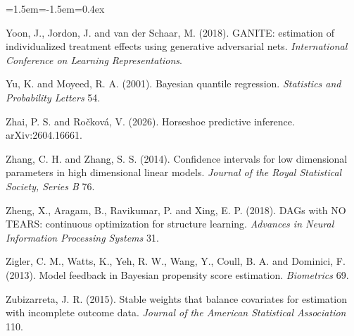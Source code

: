 \begin{list}{}{\leftmargin=1.5em\itemindent=-1.5em\itemsep=0.4ex}
\item Yoon, J., Jordon, J. and van der Schaar, M. (2018). GANITE: estimation of individualized treatment effects using generative adversarial nets. \emph{International Conference on Learning Representations}.
\item Yu, K. and Moyeed, R. A. (2001). Bayesian quantile regression. \emph{Statistics and Probability Letters} 54.
\item Zhai, P. S. and Ro\v{c}kov\'a, V. (2026). Horseshoe predictive inference. arXiv:2604.16661.
\item Zhang, C. H. and Zhang, S. S. (2014). Confidence intervals for low dimensional parameters in high dimensional linear models. \emph{Journal of the Royal Statistical Society, Series B} 76.
\item Zheng, X., Aragam, B., Ravikumar, P. and Xing, E. P. (2018). DAGs with NO TEARS: continuous optimization for structure learning. \emph{Advances in Neural Information Processing Systems} 31.
\item Zigler, C. M., Watts, K., Yeh, R. W., Wang, Y., Coull, B. A. and Dominici, F. (2013). Model feedback in Bayesian propensity score estimation. \emph{Biometrics} 69.
\item Zubizarreta, J. R. (2015). Stable weights that balance covariates for estimation with incomplete outcome data. \emph{Journal of the American Statistical Association} 110.
\end{list}
